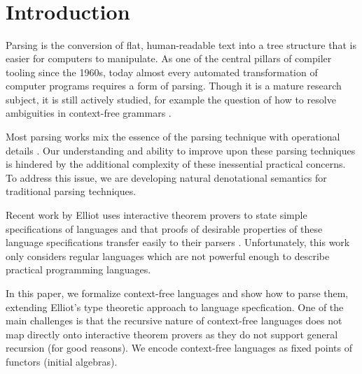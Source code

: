 \begin{code}[hide]%
\>[0]\AgdaSymbol{\{-\#}\AgdaSpace{}%
\AgdaSpace{}%
\AgdaSpace{}%
\AgdaSpace{}%
\AgdaSymbol{\#-\}}\<%
\\
\>[0]\AgdaSpace{}%
\AgdaSpace{}%
\<%
\\
%
\\[\AgdaEmptyExtraSkip]%
\>[0]\AgdaSpace{}%
\AgdaSpace{}%
\<%
\\
\>[0]\<%
\end{code}

\section{Introduction}

Parsing is the conversion of flat, human-readable text into a tree structure
that is easier for computers to manipulate.  As one of the central
pillars of compiler tooling since the 1960s, today almost every automated
transformation of computer programs requires a form of parsing.
Though it is a mature research subject, it is still actively studied, for example the question of how to resolve ambiguities in context-free grammars \cite{one-parser-to-rule-them-all}. 

Most parsing works mix the essence of the parsing technique with operational details . Our understanding and ability to improve upon these parsing techniques is hindered by the additional complexity of these inessential practical concerns. To address this issue, we are developing natural denotational semantics for traditional parsing techniques.

Recent work by Elliot uses interactive theorem provers to state simple specifications of languages and that proofs of desirable properties of these language specifications transfer easily to their parsers \cite{conal-languages}. Unfortunately, this work only considers regular languages which are not powerful enough to describe practical programming languages.


In this paper, we formalize context-free languages and show how to parse them, extending Elliot’s type theoretic approach to language specfication.  One of the main challenges is that the recursive nature of context-free languages does not map directly onto interactive theorem provers as they do not support general recursion (for good reasons). We encode context-free languages as fixed points of functors (initial algebras).

